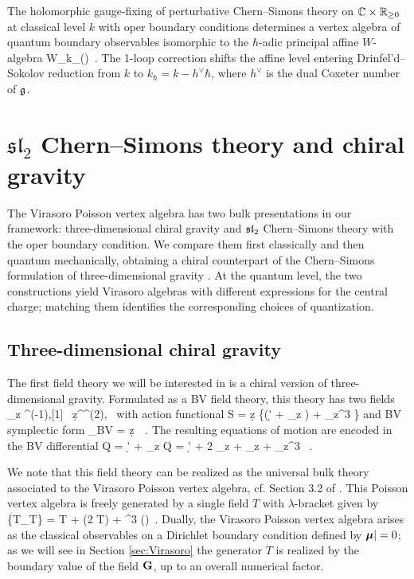 \documentclass[11pt]{amsart}
\numberwithin{equation}{section}
\numberwithin{figure}{section}
\numberwithin{table}{section}
\begin{document}
\begin{thm}\label{thm:Walgebra}
	The holomorphic gauge-fixing of perturbative Chern--Simons theory on ${\mathbb C}\times{\mathbb R}_{\geq0}$ at classical level $k$ with oper boundary conditions determines a vertex algebra of quantum boundary observables isomorphic to the $\hbar$-adic principal affine $W$-algebra
	\be
		W_{k_\hbar}(\fg)~.
	\ee
	The 1-loop correction shifts the affine level entering Drinfel'd--Sokolov reduction from $k$ to $k_\hbar = k - h^\vee \hbar $, where $h^\vee$ is the dual Coxeter number of $\mathfrak{g}$.
\end{thm}

\section{\texorpdfstring{$\mathfrak{sl}_2$}{sl2} Chern--Simons theory and chiral gravity}\label{sec:CSgravity}

The Virasoro Poisson vertex algebra has two bulk presentations in our framework: three-dimensional chiral gravity and $\mathfrak{sl}_2$ Chern--Simons theory with the oper boundary condition.
We compare them first classically and then quantum mechanically, obtaining a chiral counterpart of the Chern--Simons formulation of three-dimensional gravity \cite{Witten:1988hc}.
At the quantum level, the two constructions yield Virasoro algebras with different expressions for the central charge; matching them identifies the corresponding choices of quantization.

\subsection{Three-dimensional chiral gravity}\label{sec:ClassicalGravity}

The first field theory we will be interested in is a chiral version of three-dimensional gravity.
Formulated as a BV field theory, this theory has two fields
\be
	\bmu \partial_z \in \bOmega^{(-1),\bullet}[1] \qquad \bG\, \d z^{}\in \bOmega^{(2),\bullet}~
\ee
with action functional
\be
	S = \int\d z \left\{\bG \big(\d' \bmu + \bmu \partial_z \bmu\big) +  \bmu \partial_z^3 \bmu\right\}
\ee
and BV symplectic form
\be
	\Omega_{BV} = \int\d z~\delta \bG \delta \bmu~.
\ee
The resulting equations of motion are encoded in the BV differential
\be
	Q \bmu = \d' \bmu + \bmu \partial_z \bmu \qquad Q \bG = \d' \bG + 2 \bG \partial_z \bmu + \bmu \partial_z \bG +  \partial_z^3 \bmu~.
\ee

We note that this field theory can be realized as the universal bulk theory associated to the Virasoro Poisson vertex algebra, cf. Section 3.2 of \cite{Khan:2025rah}.
This Poisson vertex algebra is freely generated by a single field $T$ with $\lambda$-bracket given by
\be
	\{T{}_\lambda T\} = \partial T + \lambda (2 T) + \lambda^3 \bigg(\bigg)~.
\ee
Dually, the Virasoro Poisson vertex algebra arises as the classical observables on a Dirichlet boundary condition defined by $\boldsymbol{\mu}| = 0$; as we will see in Section \ref{sec:Virasoro} the generator $T$ is realized by the boundary value of the field $\mathbf{G}$, up to an overall numerical factor.
\end{document}
